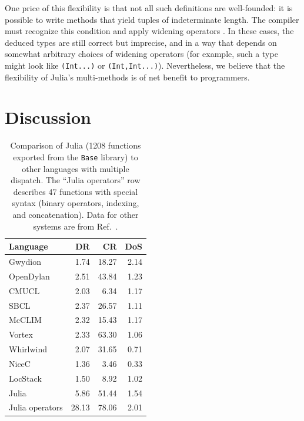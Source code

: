 \documentclass{sigplanconf}
\newcommand{\code}[1]{\texttt{#1}}
\begin{document}
One price of this flexibility is that not all such definitions are well-founded:
it is possible to write methods that yield tuples of indeterminate length.
The compiler must recognize this condition and apply widening operators
\cite{Cousot:1977, widening}. In these cases, the deduced types are
still correct but imprecise, and in a way that depends on somewhat arbitrary
choices of widening operators (for example, such a type might look
like \code{(Int...)} or \code{(Int,Int...)}). Nevertheless, we believe that the
flexibility of Julia's multi-methods is of net benefit to programmers.




\section{Discussion}

\begin{table}
\label{dispatchratios}
\begin{center}
\begin{tabular}{|l|r|r|r|}\hline
Language & DR & CR & DoS \\
\hline \hline
Gwydion    & 1.74 & 18.27 & 2.14 \\
\hline
OpenDylan  & 2.51 & 43.84 & 1.23 \\
\hline
CMUCL      & 2.03 &  6.34 & 1.17 \\
\hline
SBCL       & 2.37 & 26.57 & 1.11 \\
\hline
McCLIM     & 2.32 & 15.43 & 1.17 \\
\hline
Vortex     & 2.33 & 63.30 & 1.06 \\
\hline
Whirlwind  & 2.07 & 31.65 & 0.71 \\
\hline
NiceC      & 1.36 &  3.46 & 0.33 \\
\hline
LocStack   & 1.50 &  8.92 & 1.02 \\
\hline
Julia      & 5.86 & 51.44 & 1.54 \\
\hline
Julia operators & 28.13 & 78.06 & 2.01 \\
\hline
\end{tabular}
\end{center}
\caption{
Comparison of Julia (1208 functions exported from the \code{Base} library)
to other languages with multiple dispatch.
The ``Julia operators'' row describes 47 functions with special syntax
(binary operators, indexing, and concatenation).
Data for other systems are from Ref.~\cite{Muschevici:2008}.
}
\end{table}
\end{document}
